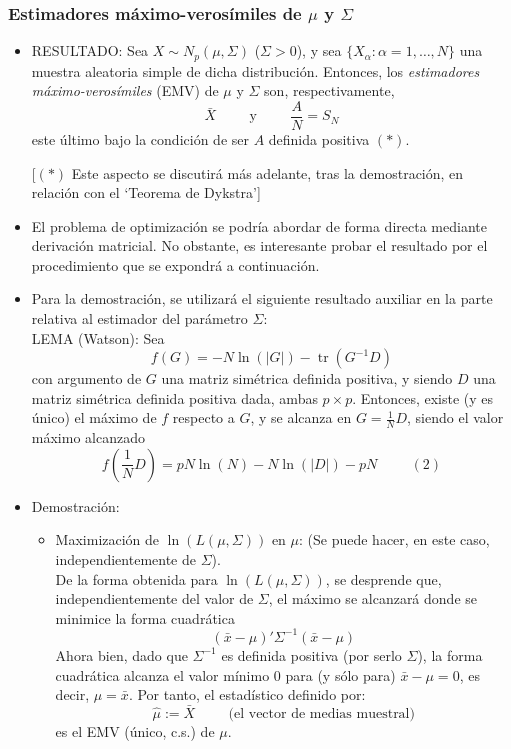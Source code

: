 \documentclass[11pt,a4paper]{article}
\begin{document}
\subsubsection{Estimadores máximo-verosímiles de \texorpdfstring{$\mu$}) y \texorpdfstring{$\Sigma$})}
\begin{itemize}
\item RESULTADO: Sea $X \sim N_{p}(\mu, \Sigma)$ ($\Sigma > 0$), y sea $\{X_{\alpha}: \alpha=1,\dots,N\}$ una muestra aleatoria simple de dicha distribución. Entonces, los \emph{estimadores máximo-verosímiles} (EMV) de $\mu$ y $\Sigma$ son, respectivamente,
$$\bar{X} \hspace{1cm} \text{y} \hspace{1cm} \frac{A}{N} = S_{N}$$
este último bajo la condición de ser $A$ definida positiva $(*)$.

[$(*)$ Este aspecto se discutirá más adelante, tras la demostración, en relación con el `Teorema de Dykstra']

\item El problema de optimización se podría abordar de forma directa mediante derivación matricial. No obstante, es interesante probar el resultado por el procedimiento que se expondrá a continuación.

\item Para la demostración, se utilizará el siguiente resultado auxiliar en la parte relativa al estimador del parámetro $\Sigma$: \\
LEMA (Watson): Sea
$$f(G) = -N\ln(|G|) - \operatorname{tr}(G^{-1}D)$$
con argumento de $G$ una matriz simétrica definida positiva, y siendo $D$ una matriz simétrica definida positiva dada, ambas $p \times p$. Entonces, existe (y es único) el máximo de $f$ respecto a $G$, y se alcanza en $G = \frac{1}{N}D$, siendo el valor máximo alcanzado
$$f(\frac{1}{N}D) = pN\ln(N) - N\ln(|D|) - pN \hspace{1cm} (2)$$

\item Demostración:
\begin{itemize}
\item Maximización de $\ln(L(\mu,\Sigma))$ en $\mu$: (Se puede hacer, en este caso, independientemente de $\Sigma$). \\
De la forma obtenida para $\ln(L(\mu,\Sigma))$, se desprende que, independientemente del valor de $\Sigma$, el máximo se alcanzará donde se minimice la forma cuadrática
$$(\bar{x} - \mu)' \Sigma^{-1} (\bar{x} - \mu)$$
Ahora bien, dado que $\Sigma^{-1}$ es definida positiva (por serlo $\Sigma$), la forma cuadrática alcanza el valor mínimo 0 para (y sólo para) $\bar{x} - \mu = 0$, es decir, $\mu = \bar{x}$. Por tanto, el estadístico definido por:
$$\hat{\mu} := \bar{X} \hspace{1cm} \text{(el vector de medias muestral)}$$
es el EMV (único, c.s.) de $\mu$.


\end{itemize}
\end{itemize}
\end{document}
